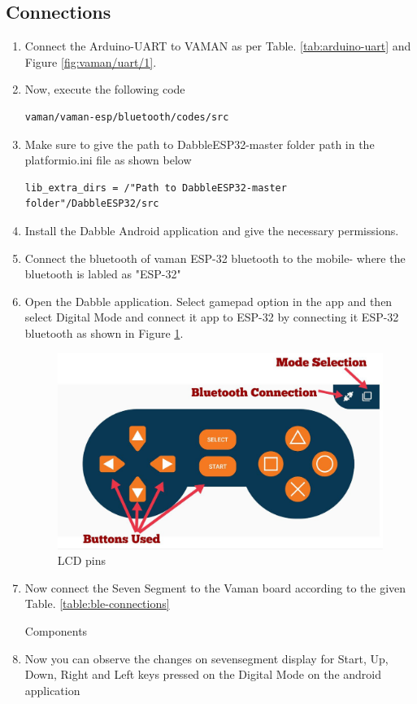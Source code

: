 \subsection{Connections}
\begin{enumerate}[label=\thesection.\arabic*.,ref=\thesection.\theenumi]
\item Connect the Arduino-UART to VAMAN as per Table. \ref{tab:arduino-uart} and Figure \ref{fig:vaman/uart/1}.
  \item Now, execute the following code
\begin{lstlisting}
vaman/vaman-esp/bluetooth/codes/src
\end{lstlisting}
\item Make sure to give the path to DabbleESP32-master folder path in the platformio.ini file as shown below
\begin{lstlisting}
lib_extra_dirs = /"Path to DabbleESP32-master folder"/DabbleESP32/src
\end{lstlisting}
\item Install the Dabble Android application and give the necessary permissions.
\item Connect the bluetooth of vaman ESP-32 bluetooth to the mobile- where the bluetooth is labled as "ESP-32"
\item Open the Dabble application. Select gamepad option in the app and then select Digital Mode and connect it app to ESP-32 by connecting it ESP-32 bluetooth as shown in Figure \ref{fig:ble_app}.
\begin{figure}[!ht]
\centering
\includegraphics[width=\columnwidth]{./vaman/vaman-esp/bluetooth/figs/ble_app.jpg}
\caption{LCD pins}
\label{fig:ble_app}
\end{figure}
\item Now connect the Seven Segment to the Vaman board according to the given Table. \ref{table:ble-connections}
\begin{table}[!ht]
\centering

\caption{Components}
\label{table:ble-connections}
\end{table}
\item Now you can observe the changes on sevensegment display for Start, Up, Down, Right and Left keys pressed on the Digital Mode on the android application
\end{enumerate}
